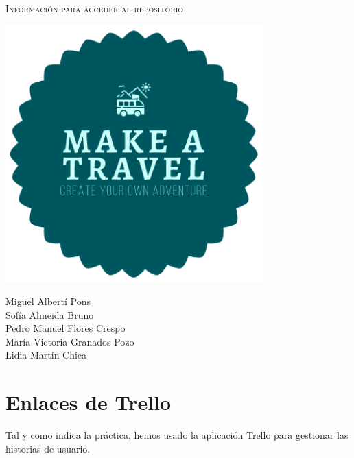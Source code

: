 \documentclass[11pt]{article}
\begin{document}
\begin{titlepage}
\centering
\vspace{4.5cm}
{\scshape\LARGE Información para acceder al repositorio \par}
\vspace{1.5cm}

\includegraphics[width=10cm]{Logo}

\vspace{3cm}
{\scshape\large \par}
\vspace{0.5cm}

{Miguel Albertí Pons\\
Sofía Almeida Bruno\\
Pedro Manuel Flores Crespo\\
María Victoria Granados Pozo\\
Lidia Martín Chica
\par}

\end{titlepage}
\newpage

\section{Enlaces de Trello}
Tal y como indica la práctica, hemos usado la aplicación Trello para gestionar las historias de usuario. 
\end{document}
